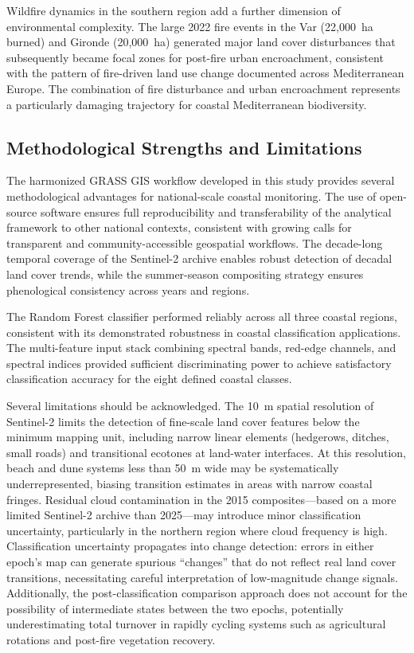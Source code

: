\documentclass[coasts,article,submit,pdftex,moreauthors]{Definitions/mdpi}
\begin{document}
Wildfire dynamics in the southern region add a further dimension of environmental complexity. The large 2022 fire events in the Var (22,000~ha burned) and Gironde (20,000~ha) generated major land cover disturbances that subsequently became focal zones for post-fire urban encroachment, consistent with the pattern of fire-driven land use change documented across Mediterranean Europe. The combination of fire disturbance and urban encroachment represents a particularly damaging trajectory for coastal Mediterranean biodiversity.

\subsection{Methodological Strengths and Limitations}

The harmonized GRASS GIS workflow developed in this study provides several methodological advantages for national-scale coastal monitoring. The use of open-source software ensures full reproducibility and transferability of the analytical framework to other national contexts, consistent with growing calls for transparent and community-accessible geospatial workflows. The decade-long temporal coverage of the Sentinel-2 archive enables robust detection of decadal land cover trends, while the summer-season compositing strategy ensures phenological consistency across years and regions.

The Random Forest classifier performed reliably across all three coastal regions, consistent with its demonstrated robustness in coastal classification applications. The multi-feature input stack combining spectral bands, red-edge channels, and spectral indices provided sufficient discriminating power to achieve satisfactory classification accuracy for the eight defined coastal classes.

Several limitations should be acknowledged. The 10~m spatial resolution of Sentinel-2 limits the detection of fine-scale land cover features below the minimum mapping unit, including narrow linear elements (hedgerows, ditches, small roads) and transitional ecotones at land-water interfaces. At this resolution, beach and dune systems less than 50~m wide may be systematically underrepresented, biasing transition estimates in areas with narrow coastal fringes. Residual cloud contamination in the 2015 composites—based on a more limited Sentinel-2 archive than 2025—may introduce minor classification uncertainty, particularly in the northern region where cloud frequency is high. Classification uncertainty propagates into change detection: errors in either epoch's map can generate spurious ``changes'' that do not reflect real land cover transitions, necessitating careful interpretation of low-magnitude change signals. Additionally, the post-classification comparison approach does not account for the possibility of intermediate states between the two epochs, potentially underestimating total turnover in rapidly cycling systems such as agricultural rotations and post-fire vegetation recovery.
\end{document}
